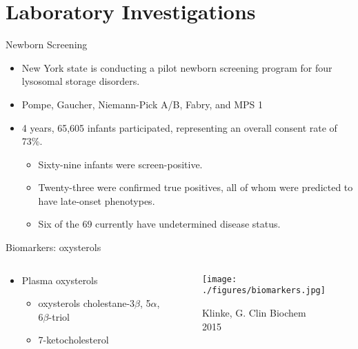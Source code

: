 \documentclass[presentation, smaller]{beamer}
\begin{document}
\section{Laboratory Investigations}
\label{sec:orgheadline21}
\begin{frame}[label={sec:orgheadline15}]{Newborn Screening}
\begin{itemize}
\item New York state is conducting a pilot newborn screening program for four lysosomal storage disorders.
\item Pompe, Gaucher, Niemann-Pick A/B, Fabry, and MPS 1

\item 4 years, 65,605 infants participated, representing an overall consent rate of 73\%.
\begin{itemize}
\item Sixty-nine infants were screen-positive.
\item Twenty-three were confirmed true positives, all of whom were predicted to have late-onset phenotypes.
\item Six of the 69 currently have undetermined disease status.
\end{itemize}
\end{itemize}
\end{frame}

\begin{frame}[label={sec:orgheadline16}]{Biomarkers: oxysterols}
\begin{columns}
\begin{column}{0.5\columnwidth}
\begin{itemize}
\item Plasma oxysterols
\begin{itemize}
\item oxysterols cholestane-3\(\beta\), 5\(\alpha\), 6\(\beta\)-triol
\item 7-ketocholesterol
\end{itemize}
\end{itemize}
\end{column}



\begin{column}{0.5\columnwidth}
\begin{figure}[htb]
\centering
\texttt{[image: ./figures/biomarkers.jpg]}
\caption{\label{fig:}
Klinke, G. Clin Biochem 2015}
\end{figure}
\end{column}
\end{columns}
\end{frame}
\end{document}
